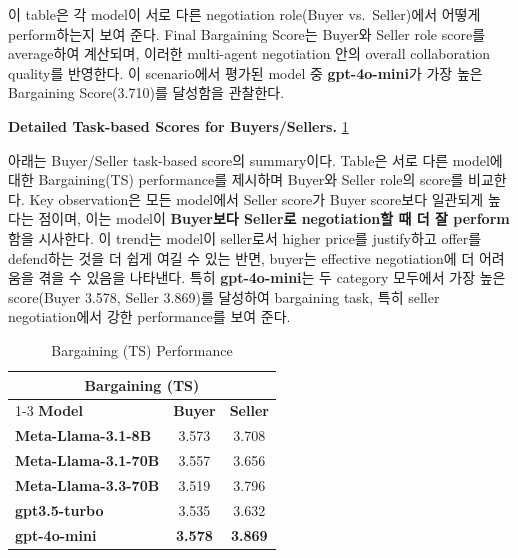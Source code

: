 \noindent
이 table은 각 model이 서로 다른 negotiation role(Buyer vs.\ Seller)에서 어떻게 perform하는지 보여 준다. Final Bargaining Score는 Buyer와 Seller role score를 average하여 계산되며, 이러한 multi-agent negotiation 안의 overall collaboration quality를 반영한다. 이 scenario에서 평가된 model 중 \textbf{gpt-4o-mini}가 가장 높은 Bargaining Score(3.710)를 달성함을 관찰한다.

\textbf{Detailed Task-based Scores for Buyers/Sellers.} \ref{detailed task scores for Buyers/Sellers}

아래는 Buyer/Seller task-based score의 summary이다. Table은 서로 다른 model에 대한 Bargaining(TS) performance를 제시하며 Buyer와 Seller role의 score를 비교한다. Key observation은 모든 model에서 Seller score가 Buyer score보다 일관되게 높다는 점이며, 이는 model이 \textbf{Buyer보다 Seller로 negotiation할 때 더 잘 perform}함을 시사한다. 이 trend는 model이 seller로서 higher price를 justify하고 offer를 defend하는 것을 더 쉽게 여길 수 있는 반면, buyer는 effective negotiation에 더 어려움을 겪을 수 있음을 나타낸다. 특히 \textbf{gpt-4o-mini}는 두 category 모두에서 가장 높은 score(Buyer 3.578, Seller 3.869)를 달성하여 bargaining task, 특히 seller negotiation에서 강한 performance를 보여 준다.
\begin{table}[h]
    \centering
    \renewcommand{\arraystretch}{1.2}
    \setlength{\tabcolsep}{10pt} %

    \begin{tabular}{l c c}
        \toprule
        \multicolumn{3}{c}{\textbf{Bargaining (TS)}} \\
        \cmidrule(lr){1-3}
        \textbf{Model} & \textbf{Buyer} & \textbf{Seller} \\
        \midrule
        \textbf{Meta-Llama-3.1-8B} & 3.573 & 3.708 \\
        \textbf{Meta-Llama-3.1-70B} & 3.557 & 3.656 \\
        \textbf{Meta-Llama-3.3-70B} & 3.519 & 3.796 \\
        \midrule
        \textbf{gpt3.5-turbo} & 3.535 & 3.632 \\
        \textbf{gpt-4o-mini} & \textbf{3.578} & \textbf{3.869} \\
        \bottomrule
    \end{tabular}

    \caption{Bargaining (TS) Performance}
    \label{detailed task scores for Buyers/Sellers}
\end{table}

